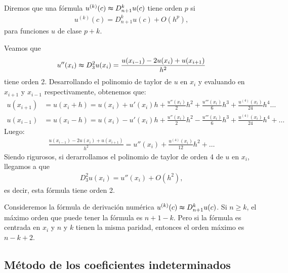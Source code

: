 \begin{defi}
    Diremos que una fórmula $u^{(k)}(c) \thickapprox D^k_{n+1}u(c)$ tiene orden $p$ si
    \begin{align*}
        u^{(k)}(c) = D^k_{n+1}u(c) + O(h^p),
    \end{align*}
    para funciones $u$ de clase $p+k$.
\end{defi}

\begin{ejemplo}
    Veamos que
    \begin{align*}
        u''(x_i) \thickapprox D^2_3u(x_i) = \frac{u(x_{i-1}) - 2u(x_i) +u(x_{i+1})}{h^2}
    \end{align*}
    tiene orden 2. Desarrollando el polinomio de taylor de $u$ en $x_i$ y evaluando en $x_{i+1}$ y $x_{i-1}$ respectivamente, obtenemos que:
    \begin{align*}
        u(x_{i+1}) & = u(x_i + h) = u(x_i) + u'(x_i)h + \frac{u''(x_i)}{2}h^2 + \frac{u'''(x_i)}{6}h^3 + \frac{u^{(4)}(x_i)}{24}h^4\ldots   \\
        u(x_{i-1}) & = u(x_i - h) = u(x_i)- u'(x_i)h + \frac{u''(x_i)}{2}h^2 - \frac{u'''(x_i)}{6}h^3 + \frac{u^{(4)}(x_i)}{24}h^4 + \ldots
    \end{align*}
    Luego:
    \begin{align*}
        \frac{u(x_{i-1}) - 2u(x_i) +u(x_{i+1})}{h^2} = u''(x_i) + \frac{u^{(4)}(x_i)}{12}h^2 + \ldots
    \end{align*}
    Siendo rigurosos, si derarrollamos el polinomio de taylor de orden 4 de $u$ en $x_i$, llegamos a que
    \begin{align*}
        D_3^2u(x_i) = u''(x_i) + O(h^2),
    \end{align*}
    es decir, esta fórmula tiene orden 2.
\end{ejemplo}

\begin{obs}
    Consideremos la fórmula de derivación numérica $u^{(k)}(c) \thickapprox D^k_{n+1}u(c)$. Si $n \ge k$, el máximo orden que puede tener la fórmula es $n+1 -k$. Pero si la fórmula es centrada en $x_i$ y $n$ y $k$ tienen la misma paridad, entonces el orden máximo es $n-k+2$.
\end{obs}

\subsection{Método de los coeficientes indeterminados}

